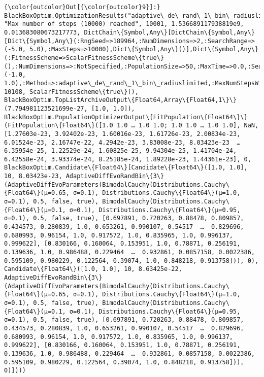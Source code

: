 \documentclass[11pt]{article}
\begin{document}
\begin{Verbatim}[commandchars=\\\{\}]
{\color{outcolor}Out[{\color{outcolor}9}]:} BlackBoxOptim.OptimizationResults("adaptive\_de\_rand\_1\_bin\_radiuslimited", "Max number of steps (10000) reached", 10001, 1.536689117938819e9, 0.013683080673217773, DictChain\{Symbol,Any\}[DictChain\{Symbol,Any\}[Dict\{Symbol,Any\}(:RngSeed=>189964,:NumDimensions=>2,:SearchRange=>(-5.0, 5.0),:MaxSteps=>10000),Dict\{Symbol,Any\}()],Dict\{Symbol,Any\}(:FitnessScheme=>ScalarFitnessScheme\{true\}(),:NumDimensions=>:NotSpecified,:PopulationSize=>50,:MaxTime=>0.0,:SearchRange=>(-1.0, 1.0),:Method=>:adaptive\_de\_rand\_1\_bin\_radiuslimited,:MaxNumStepsWithoutFuncEvals=>100,:RngSeed=>1234,:MaxFuncEvals=>0,:SaveTrace=>false…)], 10108, ScalarFitnessScheme\{true\}(), BlackBoxOptim.TopListArchiveOutput\{Float64,Array\{Float64,1\}\}(7.794981123521699e-27, [1.0, 1.0]), BlackBoxOptim.PopulationOptimizerOutput\{FitPopulation\{Float64\}\}(FitPopulation\{Float64\}([1.0 1.0 … 1.0 1.0; 1.0 1.0 … 1.0 1.0], NaN, [1.27603e-23, 3.92402e-23, 1.60016e-23, 1.61726e-23, 2.00834e-23, 6.01524e-23, 2.16747e-22, 4.2942e-23, 3.83008e-23, 8.03423e-23  …  6.35954e-25, 1.22529e-24, 1.60825e-25, 9.94304e-25, 1.41704e-24, 6.42558e-24, 3.93374e-24, 8.25185e-24, 1.89228e-23, 1.44361e-23], 0, BlackBoxOptim.Candidate\{Float64\}[Candidate\{Float64\}([1.0, 1.0], 10, 8.03423e-23, AdaptiveDiffEvoRandBin\{3\}(AdaptiveDiffEvoParameters(BimodalCauchy(Distributions.Cauchy\{Float64\}(μ=0.65, σ=0.1), Distributions.Cauchy\{Float64\}(μ=1.0, σ=0.1), 0.5, false, true), BimodalCauchy(Distributions.Cauchy\{Float64\}(μ=0.1, σ=0.1), Distributions.Cauchy\{Float64\}(μ=0.95, σ=0.1), 0.5, false, true), [0.697891, 0.720263, 0.88478, 0.809857, 0.434573, 0.280839, 1.0, 0.653261, 0.990107, 0.54517  …  0.829696, 0.680993, 0.96154, 1.0, 0.917572, 1.0, 0.835965, 1.0, 0.996137, 0.999622], [0.830166, 0.160064, 0.153951, 1.0, 0.78871, 0.256191, 0.139636, 1.0, 0.986488, 0.229464  …  0.932861, 0.0857158, 0.0022386, 0.595109, 0.980229, 0.122564, 0.39074, 1.0, 0.848218, 0.913758])), 0), Candidate\{Float64\}([1.0, 1.0], 10, 8.63425e-22, AdaptiveDiffEvoRandBin\{3\}(AdaptiveDiffEvoParameters(BimodalCauchy(Distributions.Cauchy\{Float64\}(μ=0.65, σ=0.1), Distributions.Cauchy\{Float64\}(μ=1.0, σ=0.1), 0.5, false, true), BimodalCauchy(Distributions.Cauchy\{Float64\}(μ=0.1, σ=0.1), Distributions.Cauchy\{Float64\}(μ=0.95, σ=0.1), 0.5, false, true), [0.697891, 0.720263, 0.88478, 0.809857, 0.434573, 0.280839, 1.0, 0.653261, 0.990107, 0.54517  …  0.829696, 0.680993, 0.96154, 1.0, 0.917572, 1.0, 0.835965, 1.0, 0.996137, 0.999622], [0.830166, 0.160064, 0.153951, 1.0, 0.78871, 0.256191, 0.139636, 1.0, 0.986488, 0.229464  …  0.932861, 0.0857158, 0.0022386, 0.595109, 0.980229, 0.122564, 0.39074, 1.0, 0.848218, 0.913758])), 0)])))
\end{Verbatim}
            
\end{document}

